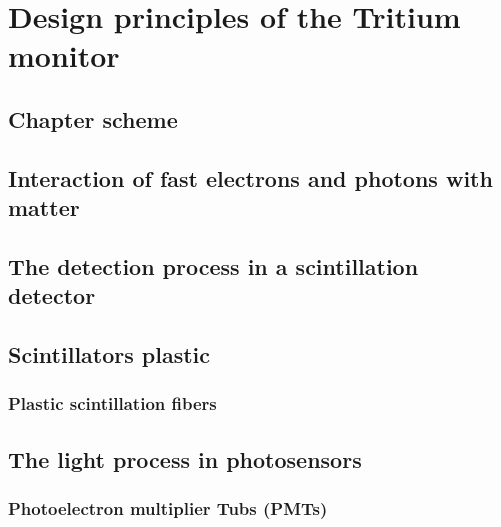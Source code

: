 \documentclass[12pt,a4paper]{book}
\begin{document}
\chapter[Design principles]{Design principles of the Tritium monitor}\label{chap:DesignPrinciples}
	\section{Chapter scheme}
	 \label{sec:IntroDesignPrinciples}
	\newpage

	\section[Interaction of particles with matter]{Interaction of fast electrons and photons with matter}
	 \label{sec:Interaction}
	\newpage	
	
	\section[The detection process]{The detection process in a scintillation detector}
	 \label{sec:DetectionProcess}
	\newpage
	
	\section{Scintillators plastic} %
	\label{sec:PlasticScintillators}
		
		\subsection{Plastic scintillation fibers}
		\label{subsec:PlasticScintillatorFibers}
		\newpage
		
	\section{The light process in photosensors} %
	\label{sec:Photosensors}
	
			\subsection{Photoelectron multiplier Tubs (PMTs)}%
			\label{subsec:PMTs}
		
\end{document}
